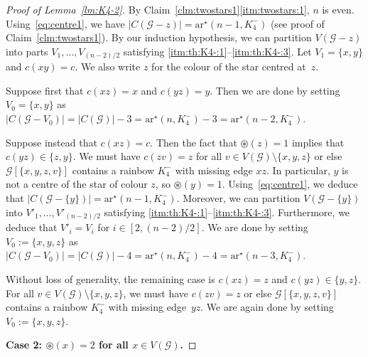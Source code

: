 \documentclass[a4paper, 12pt]{article}
\numberwithin{equation}{section}
\def\sm{{\setminus}}
\def\sar{{\mathrm{ar}^{\star}}}
\def\cen{\circledast}
\newcommand{\ms}[1]{\mathscr{#1}}
\begin{document}
\begin{proof}[Proof of Lemma~\ref{lm:K4-2}]
\medskip
\noindent
By Claim~\ref{clm:twostars1}\ref{itm:twostars:1}, $n$ is even. 
Using~\eqref{eq:centre1}, we have $|C(\ms{G}-z)| = \sar(n-1, K_4^-)$ (see proof of Claim~\ref{clm:twostars1}).
By our induction hypothesis, we can partition $V(\ms{G} - z)$ into parts $V_1, \dots, V_{(n-2)/2}$ satisfying \ref{itm:th:K4-:1}--\ref{itm:th:K4-:3}.
Let $V_1 = \{ x,y\}$ and $c(xy) = c$. 
We also write $z$ for the colour of the star centred at~$z$. 


Suppose first that 
$c(xz) = x$ and $c(yz) = y$. Then we are done by setting $V_0 = \{x,y\}$ as $|C(\ms{G} -V_0)| = |C(\ms{G})| - 3 = \sar(n,K_4^-) -3 = \sar(n-2,K_4^-)$. 

Suppose instead that $c(xz) = c$. Then 
the fact that $\cen(z) = 1$ implies that $c(yz) \in \{z,y\}$.
We must have $c(zv)=z$ for all $v \in V(\ms{G}) \sm \{x,y,z\}$ or else $\ms{G}[\{x,y,z,v\}]$ contains a rainbow $K_4^-$ with missing edge $xz$.
In particular, $y$ is not a centre of the star of colour $z$, 
so $\cen(y) = 1$.
Using~\eqref{eq:centre1}, we deduce that $|C(\ms{G}-\{y\})| = \sar(n-1, K_4^-)$.
Moreover, we can partition $V(\ms{G} -\{y\})$ into $V'_1, \dots, V'_{(n-2)/2}$ satisfying \ref{itm:th:K4-:1}--\ref{itm:th:K4-:3}.
Furthermore, we deduce that $V'_i = V_i$ for $i \in [2, (n-2)/2]$.
We are done by setting $V_0 := \{x,y,z\}$ as $|C(\ms{G} -V_0)| = |C(\ms{G})| - 4 = \sar(n,K_4^-) -4 = \sar(n-3,K_4^-)$. 

Without loss of generality, the remaining case is $c(xz) = z$ and $c(yz) \in \{y,z\}$. 
For all $v \in V(\ms{G}) \setminus \{x,y,z\}$, we must have $c(zv) = z$ or else $\ms{G}[\{x,y,z,v\}]$ contains a rainbow $K_4^-$ with missing edge~$yz$. 
We are again done by setting $V_0 := \{x,y,z\}$.

\medskip
\noindent
\textbf{Case 2: $\cen(x) = 2$ for all $x \in V(\ms{G})$.}


\end{proof}
\end{document}
